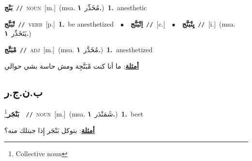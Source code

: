 \documentclass[10pt,a4paper,twoside]{article} %
\begin{document}
\begin{multicols}{2}
{\setlength\topsep{0pt}\textbf{\foreignlanguage{arabic}{بَنْج}}\ {\color{gray}\texttt{//}\color{black}}\ \textsc{noun}\ [m.]\ \color{gray}(msa. \foreignlanguage{arabic}{مُخَدِّر}~\foreignlanguage{arabic}{\textbf{١.}})\color{black}\ \textbf{1.}~anesthetic\ } \vspace{2mm}

{\setlength\topsep{0pt}\textbf{\foreignlanguage{arabic}{تْبَنَّج}}\ {\color{gray}\texttt{//}\color{black}}\ \textsc{verb}\ [p.]\ \textbf{1.}~be anesthetized\ \ $\bullet$\ \ \setlength\topsep{0pt}\textbf{\foreignlanguage{arabic}{اِتْبَنَّج}}\ {\color{gray}\texttt{//}\color{black}}\ [c.]\ \ $\bullet$\ \ \setlength\topsep{0pt}\textbf{\foreignlanguage{arabic}{يِتْبَنَّج}}\ {\color{gray}\texttt{//}\color{black}}\ [i.]\ \color{gray}(msa. \foreignlanguage{arabic}{يَتَخَدِّر}~\foreignlanguage{arabic}{\textbf{١.}})\color{black}\ } \vspace{2mm}

{\setlength\topsep{0pt}\textbf{\foreignlanguage{arabic}{مْبَنَّج}}\ {\color{gray}\texttt{//}\color{black}}\ \textsc{adj}\ [m.]\ \color{gray}(msa. \foreignlanguage{arabic}{مُخَدَّر}~\foreignlanguage{arabic}{\textbf{١.}})\color{black}\ \textbf{1.}~anesthetized\  \begin{flushright}\color{gray}\foreignlanguage{arabic}{\textbf{\underline{\foreignlanguage{arabic}{أمثلة}}}: ما أنا كنت مْبَنَّجِة ومش حاسة بشي حوالي}\end{flushright}\color{black}} \vspace{2mm}

\vspace{-3mm}
\subsection*{\color{blue}\foreignlanguage{arabic}{ب.ن.ج.ر}\color{blue}{}} 

{\setlength\topsep{0pt}\textbf{\foreignlanguage{arabic}{بَنْجَر}}\footnote{Collective noun}\ \ {\color{gray}\texttt{//}\color{black}}\ \textsc{noun}\ [m.]\ \color{gray}(msa. \foreignlanguage{arabic}{شَمَنْدَر}~\foreignlanguage{arabic}{\textbf{١.}})\color{black}\ \textbf{1.}~beet\  \begin{flushright}\color{gray}\foreignlanguage{arabic}{\textbf{\underline{\foreignlanguage{arabic}{أمثلة}}}: بتوكل بَنْجَر إِذا جبتلك منه؟}\end{flushright}\color{black}} \vspace{2mm}


\end{multicols}
\end{document}
